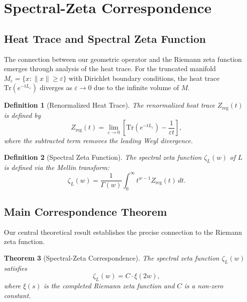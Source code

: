 \documentclass[12pt]{article}
\newtheorem{theorem}{Theorem}[section]
\newtheorem{definition}[theorem]{Definition}
\begin{document}
\section{Spectral-Zeta Correspondence}

\subsection{Heat Trace and Spectral Zeta Function}

The connection between our geometric operator and the Riemann zeta function emerges through analysis of the heat trace. For the truncated manifold $M_\varepsilon = \{x : \|x\| \geq \varepsilon\}$ with Dirichlet boundary conditions, the heat trace $\text{Tr}(e^{-tL_\varepsilon})$ diverges as $\varepsilon \to 0$ due to the infinite volume of $M$.

\begin{definition}[Renormalized Heat Trace]
The \textit{renormalized heat trace} $Z_{\text{reg}}(t)$ is defined by
\begin{equation}
Z_{\text{reg}}(t) = \lim_{\varepsilon \to 0} \left[\text{Tr}(e^{-tL_\varepsilon}) - \frac{1}{\varepsilon t}\right],
\end{equation}
where the subtracted term removes the leading Weyl divergence.
\end{definition}

\begin{definition}[Spectral Zeta Function]
The spectral zeta function $\zeta_L(w)$ of $L$ is defined via the Mellin transform:
\begin{equation}
\zeta_L(w) = \frac{1}{\Gamma(w)} \int_0^\infty t^{w-1} Z_{\text{reg}}(t) \, dt.
\end{equation}
\end{definition}

\subsection{Main Correspondence Theorem}

Our central theoretical result establishes the precise connection to the Riemann zeta function.

\begin{theorem}[Spectral-Zeta Correspondence]
The spectral zeta function $\zeta_L(w)$ satisfies
\begin{equation}
\zeta_L(w) = C \cdot \xi(2w),
\end{equation}
where $\xi(s)$ is the completed Riemann zeta function and $C$ is a non-zero constant.
\end{theorem}
\end{document}
